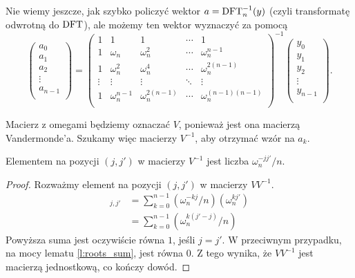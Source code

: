 \documentclass[11pt]{scrartcl}
\begin{document}
    Nie wiemy jeszcze, jak szybko policzyć wektor $a = \operatorname{DFT}_n^{-1}(y)$ (czyli transformatę odwrotną do $\operatorname{DFT}$), ale możemy ten wektor wyznaczyć za pomocą
    \begin{equation*}
        \begin{pmatrix}
            a_0 \\
            a_1 \\
            a_2 \\
            \vdots \\
            a_{n-1} \\
        \end{pmatrix}
        =
        \begin{pmatrix}
            1 & 1 & 1 & \cdots & 1 \\
            1 & \omega_n & \omega_n^2 & \cdots & \omega_n^{n-1} \\
            1 & \omega_n^2 & \omega_n^4  & \cdots & \omega_n^{2(n-1)} \\
            \vdots & \vdots  & \vdots & \ddots & \vdots    \\
            1 & \omega_n^{n-1} & \omega_n^{2(n-1)}  & \cdots & \omega_n^{(n-1)(n-1)} \\
        \end{pmatrix}^{-1}
        \begin{pmatrix}
            y_0 \\
            y_1 \\
            y_2 \\
            \vdots \\
            y_{n-1} \\
        \end{pmatrix}.
    \end{equation*}

    Macierz z omegami będziemy oznaczać $V$, ponieważ jest ona macierzą Vandermonde'a. Szukamy więc macierzy $V^{-1}$, aby otrzymać wzór na $a_k$.

    \begin{lemma}
        Elementem na pozycji $(j, j')$ w macierzy $V^{-1}$ jest liczba $\omega_n^{-jj'}/n$.
    \end{lemma}
    \begin{proof}
        Rozważmy element na pozycji $(j, j')$ w macierzy $VV^{-1}$.
        \begin{align*}
            [VV^{-1}]_{j,j'} &= \sum_{k = 0}^{n-1}(\omega_n^{-kj}/n)(\omega_n^{kj'}) \\
                             &= \sum_{k = 0}^{n-1}(\omega_n^{k(j'-j)}/n)
        \end{align*}
        Powyższa suma jest oczywiście równa $1$, jeśli $j = j'$. W przeciwnym przypadku, na mocy lematu \ref{l:roots_sum}, jest równa $0$. Z tego wynika, że $VV^{-1}$ jest macierzą jednostkową, co kończy dowód.
    \end{proof}
\end{document}
